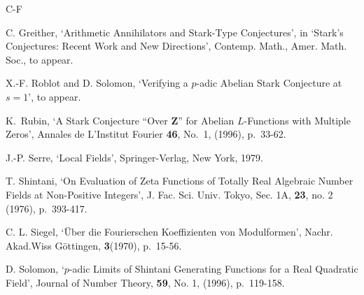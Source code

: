 \documentclass[12pt]{article}
\newcounter{rem}[section]%
\newcommand{\bbZ}{\ensuremath{\mathbb{Z}}}
\newcommand{\rem}{\refstepcounter{rem}\noindent{\sc Remark \therem}}%
\renewcommand{\therem}{\thesection.\arabic{rem}}
\begin{document}
\begin{thebibliography}{C-F}





C. Greither, `Arithmetic Annihilators and Stark-Type Conjectures',
in `Stark's Conjectures: Recent Work and New Directions', Contemp. Math.,
Amer. Math. Soc., to appear.

X.-F. Roblot and D. Solomon,
`Verifying a $p$-adic Abelian Stark Conjecture at $s=1$', to appear.

K.~Rubin, `A Stark Conjecture ``Over {\bf Z}'' for Abelian
$L$-Functions with Multiple Zeros', Annales de L'Institut Fourier
{\bf 46}, No.~1, (1996), p.~33-62.



J.-P. Serre, `Local Fields', Springer-Verlag, New York, 1979.

T. Shintani, `On Evaluation of Zeta Functions of Totally Real
Algebraic Number Fields at Non-Positive Integers', J. Fac. Sci.
Univ. Tokyo, Sec. 1A, {\bf 23}, no. 2 (1976), p.~393-417.

C. L. Siegel, `\"Uber die Fourierschen Koeffizienten von
Modulformen', Nachr. Akad.Wiss G\"ottingen, {\bf 3}(1970),
p.~15-56.

D. Solomon, `$p$-adic Limits of Shintani Generating Functions for
a Real Quadratic Field', Journal of Number Theory, {\bf 59}, No.
1, (1996), p.~119-158.


\end{thebibliography}
\end{document}
